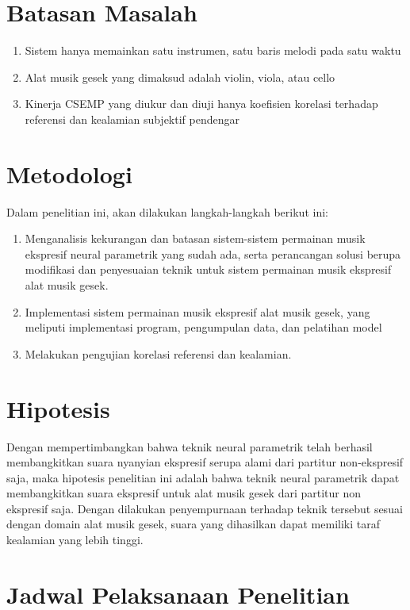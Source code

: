 \section{Batasan Masalah}

\begin{enumerate}
	\item Sistem hanya memainkan satu instrumen, satu baris melodi pada satu waktu
	\item Alat musik gesek yang dimaksud adalah violin, viola, atau cello
	\item Kinerja CSEMP yang diukur dan diuji hanya koefisien korelasi terhadap referensi dan kealamian subjektif pendengar
\end{enumerate}

\section{Metodologi} \label{methodology}

Dalam penelitian ini, akan dilakukan langkah-langkah berikut ini:
\begin{enumerate}
	\item Menganalisis kekurangan dan batasan sistem-sistem permainan musik ekspresif neural parametrik yang sudah ada, serta perancangan solusi berupa modifikasi dan penyesuaian teknik untuk sistem permainan musik ekspresif alat musik gesek.
	\item Implementasi sistem permainan musik ekspresif alat musik gesek, yang meliputi implementasi program, pengumpulan data, dan pelatihan model
	\item Melakukan pengujian korelasi referensi dan kealamian.
\end{enumerate}

\section{Hipotesis}

Dengan mempertimbangkan bahwa teknik neural parametrik telah berhasil membangkitkan suara nyanyian ekspresif serupa alami dari partitur non-ekspresif saja, maka hipotesis penelitian ini adalah bahwa teknik neural parametrik dapat membangkitkan suara ekspresif untuk alat musik gesek dari partitur non ekspresif saja. Dengan dilakukan penyempurnaan terhadap teknik tersebut sesuai dengan domain alat musik gesek, suara yang dihasilkan dapat memiliki taraf kealamian yang lebih tinggi.

\section{Jadwal Pelaksanaan Penelitian}

